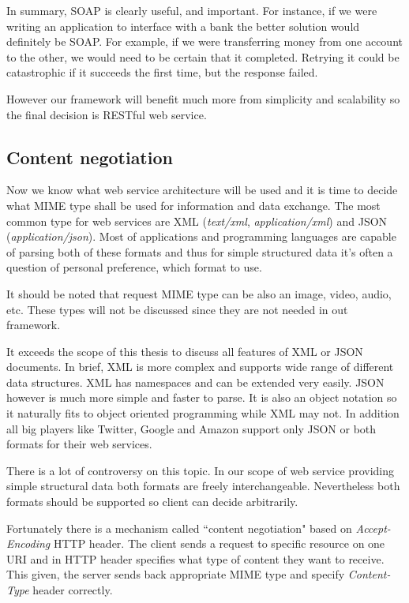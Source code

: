 \documentclass[thesis=M,english]{FITthesis}[2012/10/20]
\begin{document}
In summary, SOAP is clearly useful, and important. For instance, if we were writing an application to interface with a bank the better solution would definitely be SOAP. For example, if we were transferring money from one account to the other, we would need to be certain that it completed. Retrying it could be catastrophic if it succeeds the first time, but the response failed.\cite{spf13}

However our framework will benefit much more from simplicity and scalability so the final decision is RESTful web service.


\subsection{Content negotiation}
Now we know what web service architecture will be used and it is time to decide what MIME type shall be used for information and data exchange. The most common type for web services are XML (\textit{text/xml}, \textit{application/xml}) and JSON (\textit{application/json}). Most of applications and programming languages are capable of parsing both of these formats and thus for simple structured data it’s often a question of personal preference, which format to use.

It should be noted that request MIME type can be also an image, video, audio, etc. These types will not be discussed since they are not needed in out framework.

It exceeds the scope of this thesis to discuss all features of XML or JSON documents. In brief, XML is more complex and supports wide range of different data structures. XML has namespaces and can be extended very easily. JSON however is much more simple and faster to parse. It is also an object notation so it naturally fits to object oriented programming while XML may not. In addition all big players like Twitter, Google and Amazon support only JSON or both formats for their web services.

There is a lot of controversy on this topic. In our scope of web service providing simple structural data both formats are freely interchangeable. Nevertheless both formats should be supported so client can decide arbitrarily.

Fortunately there is a mechanism called ``content negotiation" based on \textit{Accept-Encoding} HTTP header. The client sends a request to specific resource on one URI and in HTTP header specifies what type of content they want to receive. This given, the server sends back appropriate MIME type and specify \textit{Content-Type} header correctly.
\end{document}
